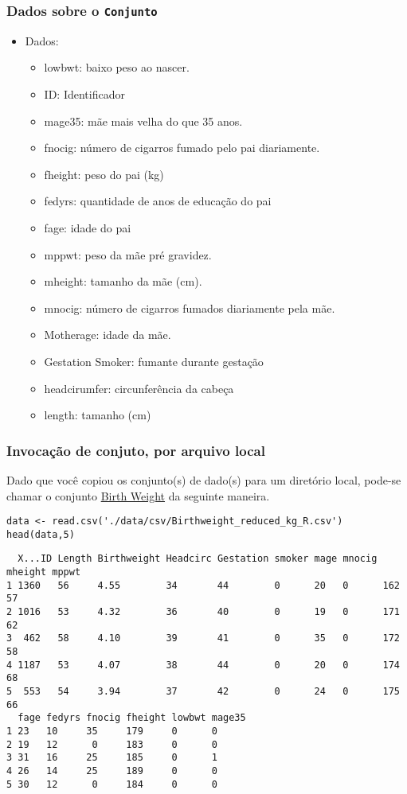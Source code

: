 \documentclass[12pt]{article}
\begin{document}
\subsubsection{Dados sobre o \texttt{Conjunto}}
\label{sec:orgcabc7ec}
\begin{itemize}
\item Dados:
\begin{itemize}
\item lowbwt: baixo peso ao nascer.
\item ID: Identificador
\item mage35: mãe mais velha do que 35 anos.
\item fnocig: número de cigarros fumado pelo pai diariamente.
\item fheight: peso do pai (kg)
\item fedyrs: quantidade de anos de educação do pai
\item fage: idade do pai
\item mppwt: peso da mãe pré gravidez.
\item mheight: tamanho da mãe (cm).
\item mnocig: número de cigarros fumados diariamente pela mãe.
\item Motherage: idade da mãe.
\item Gestation Smoker: fumante durante gestação
\item headcirumfer: circunferência da cabeça
\item length: tamanho (cm)
\end{itemize}
\end{itemize}
\subsubsection{Invocação de conjuto, por arquivo local}
\label{sec:org9855019}

Dado que você copiou os conjunto(s) de dado(s) para um diretório
local, pode-se chamar o conjunto \href{https://drive.google.com/file/d/1xv2lCPsj04FjGPQ\_BgPS9mrTIjBcyHQk/view?usp=sharing}{Birth Weight} da seguinte maneira.

\begin{verbatim}
data <- read.csv('./data/csv/Birthweight_reduced_kg_R.csv')
head(data,5)
\end{verbatim}

\begin{verbatim}
  X...ID Length Birthweight Headcirc Gestation smoker mage mnocig mheight mppwt
1 1360   56     4.55        34       44        0      20   0      162     57   
2 1016   53     4.32        36       40        0      19   0      171     62   
3  462   58     4.10        39       41        0      35   0      172     58   
4 1187   53     4.07        38       44        0      20   0      174     68   
5  553   54     3.94        37       42        0      24   0      175     66   
  fage fedyrs fnocig fheight lowbwt mage35
1 23   10     35     179     0      0     
2 19   12      0     183     0      0     
3 31   16     25     185     0      1     
4 26   14     25     189     0      0     
5 30   12      0     184     0      0     
\end{verbatim}
\clearpage
\end{document}
